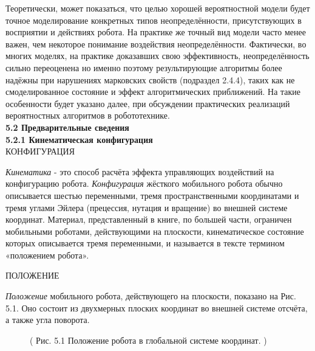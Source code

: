 \documentclass[10pt,a4paper]{article}
\begin{document}
Теоретически, может показаться, что целью хорошей вероятностной модели будет точное моделирование конкретных типов неопределённости, присутствующих в восприятии и действиях робота. На практике же точный вид модели часто менее важен, чем некоторое понимание воздействия неопределённости. Фактически, во многих моделях, на практике доказавших свою эффективность, неопределённость сильно переоценена но именно поэтому результирующие алгоритмы более надёжны при нарушениях марковских свойств (подраздел 2.4.4), таких как не смоделированное состояние и эффект алгоритмических приближений. На такие особенности будет указано далее, при обсуждении практических реализаций вероятностных алгоритмов в робототехнике. \\

\textbf{5.2 Предварительные сведения}\\

\textbf{5.2.1 Кинематическая конфигурация}\\

КОНФИГУРАЦИЯ

\textit{Кинематика} - это способ расчёта эффекта управляющих воздействий на конфигурацию робота.  
\textit{Конфигурация} жёсткого мобильного робота обычно описывается шестью переменными, тремя пространственными координатами и тремя углами Эйлера (прецессия, нутация и вращение) во внешней системе координат. Материал, представленный в книге, по большей части, ограничен мобильными роботами, действующими на плоскости, кинематическое состояние которых описывается тремя переменными, и называется в тексте термином «положением робота».

ПОЛОЖЕНИЕ
 
\textit{Положение} мобильного робота, действующего на плоскости, показано на Рис. 5.1.
Оно состоит из двухмерных плоских координат во внешней системе отсчёта, а также угла поворота. 

\begin{figure}[H]
	\caption{ (  Рис. 5.1 Положение робота в глобальной системе координат. )}
	\label{fig:51orig}
\end{figure}
\end{document}
